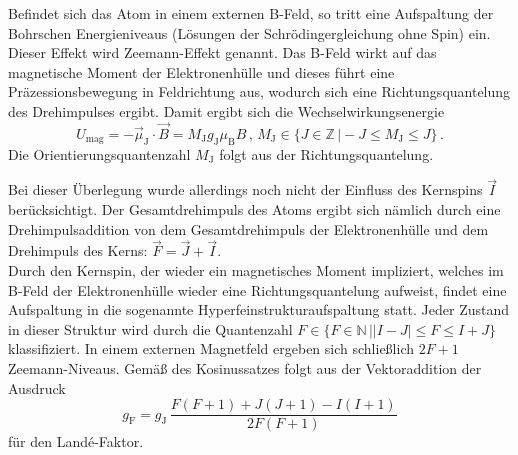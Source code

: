 Befindet sich das Atom in einem externen B-Feld, so tritt eine Aufspaltung der Bohrschen
Energieniveaus (Lösungen der Schrödingergleichung ohne Spin) ein. Dieser Effekt wird Zeemann-Effekt genannt.
Das B-Feld wirkt auf das magnetische Moment der Elektronenhülle und dieses führt eine Präzessionsbewegung
in Feldrichtung aus, wodurch sich eine Richtungsquantelung des Drehimpulses ergibt. Damit
ergibt sich die Wechselwirkungsenergie
\begin{equation}
	U_{\mathrm{mag}} = - \vec{\mu}_{\mathrm{J}} \cdot \vec{B} = M_{\mathrm{J}} g_{\mathrm{J}} \mu_{\mathrm{B}} B \, \mathrm{,} \, M_{\mathrm{J}} \in \{J \in \mathbb{Z} \, \vert -J \le M_{\mathrm{J}} \le J\} \, \mathrm{.}
\end{equation}
Die Orientierungsquantenzahl $M_{\mathrm{J}}$ folgt aus der Richtungsquantelung.

Bei dieser Überlegung wurde allerdings noch nicht der Einfluss des Kernspins $\vec{I}$
berücksichtigt.
Der Gesamtdrehimpuls des Atoms ergibt sich nämlich durch eine Drehimpulsaddition von dem
Gesamtdrehimpuls der Elektronenhülle und dem Drehimpuls des Kerns: $\vec{F}=\vec{J}+\vec{I}$.\\
Durch den Kernspin, der wieder ein magnetisches Moment impliziert, welches im B-Feld der
Elektronenhülle wieder eine Richtungsquantelung aufweist, findet eine Aufspaltung in die
sogenannte Hyperfeinstrukturaufspaltung statt. Jeder Zustand in dieser Struktur wird durch
die Quantenzahl $F \in \{F \in \mathbb{N} \, \vert |I-J| \le F \le I+J \}$ klassifiziert.
In einem externen Magnetfeld ergeben sich schließlich $2F+1$ Zeemann-Niveaus.
Gemäß des Kosinussatzes folgt aus der Vektoraddition der Ausdruck
\begin{equation}
	\label{eqn:g}
	g_{\mathrm{F}} = g_{\mathrm{J}} \, \frac{F(F+1)+J(J+1)-I(I+1)}{2F(F+1)}
\end{equation}
für den Land\'{e}-Faktor.

